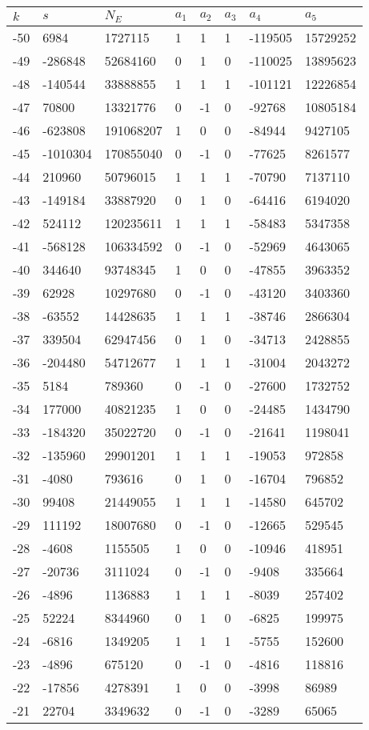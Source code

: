 \documentclass{amsart}
\begin{document}
\begin{longtable}{|l|l|l|lllll|}
\hline
$k$ & $s$ & $N_E$ & $a_1$ & $a_2$ & $a_3$ & $a_4$ & $a_5$\\
\hline
-50&6984&1727115&1&1&1&-119505&15729252\\
-49&-286848&52684160&0&1&0&-110025&13895623\\
-48&-140544&33888855&1&1&1&-101121&12226854\\
-47&70800&13321776&0&-1&0&-92768&10805184\\
-46&-623808&191068207&1&0&0&-84944&9427105\\
-45&-1010304&170855040&0&-1&0&-77625&8261577\\
-44&210960&50796015&1&1&1&-70790&7137110\\
-43&-149184&33887920&0&1&0&-64416&6194020\\
-42&524112&120235611&1&1&1&-58483&5347358\\
-41&-568128&106334592&0&-1&0&-52969&4643065\\
-40&344640&93748345&1&0&0&-47855&3963352\\
-39&62928&10297680&0&-1&0&-43120&3403360\\
-38&-63552&14428635&1&1&1&-38746&2866304\\
-37&339504&62947456&0&1&0&-34713&2428855\\
-36&-204480&54712677&1&1&1&-31004&2043272\\
-35&5184&789360&0&-1&0&-27600&1732752\\
-34&177000&40821235&1&0&0&-24485&1434790\\
-33&-184320&35022720&0&-1&0&-21641&1198041\\
-32&-135960&29901201&1&1&1&-19053&972858\\
-31&-4080&793616&0&1&0&-16704&796852\\
-30&99408&21449055&1&1&1&-14580&645702\\
-29&111192&18007680&0&-1&0&-12665&529545\\
-28&-4608&1155505&1&0&0&-10946&418951\\
-27&-20736&3111024&0&-1&0&-9408&335664\\
-26&-4896&1136883&1&1&1&-8039&257402\\
-25&52224&8344960&0&1&0&-6825&199975\\
-24&-6816&1349205&1&1&1&-5755&152600\\
-23&-4896&675120&0&-1&0&-4816&118816\\
-22&-17856&4278391&1&0&0&-3998&86989\\
-21&22704&3349632&0&-1&0&-3289&65065\\

\end{longtable}
\end{document}
